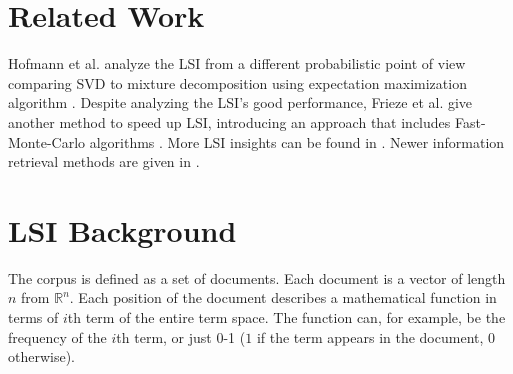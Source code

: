 \documentclass[a4paper,11pt,DIV=15]{scrartcl} %
\theoremstyle{plain}
\theoremstyle{definition}
\begin{document}
\section{Related Work}
Hofmann et al. analyze the LSI from a different probabilistic point of view comparing SVD to mixture decomposition using expectation maximization algorithm \cite{Relatedwork1}.
Despite analyzing the LSI's good performance, Frieze et al. give another method to speed up LSI, introducing an approach that includes Fast-Monte-Carlo algorithms \cite{Relatedwork2}. More LSI insights can be found in \cite{SVDNEW1, SVDNEW2, SVDNEW3, RELATED}. Newer information retrieval methods are given in \cite{GNN, HYLe17}.





 

\section{LSI Background} \label{LSI Background} %
The corpus is defined as a set of documents. Each document is a vector of length $n$ from $\mathbb{R}^n$. Each position of the document describes a mathematical function in terms of $i$th term of the entire term space. The function can, for example, be the frequency of the $i$th term, or just 0-1 ($1$ if the term appears in the document, $0$ otherwise).
\end{document}
